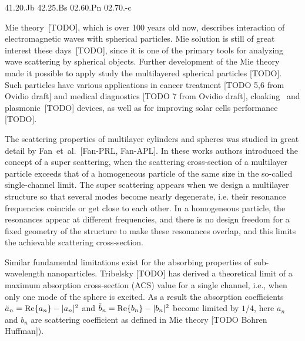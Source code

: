 \documentclass[aps,prl,twocolumn,showpacs,superscriptaddress,groupedaddress]{revtex4-1}
\begin{document}
\pacs%
{41.20.Jb 42.25.Bs 02.60.Pn 02.70.-c}

\maketitle %

Mie theory~[TODO], which is over 100 years old now, describes
interaction of electromagnetic waves with spherical particles. Mie
solution is still of great interest these days~[TODO], since it is one
of the primary tools for analyzing wave scattering by spherical
objects. Further development of the Mie theory~\cite{Yang-2003,
  Pena-scattnlay-2009} made it possible to apply study the
multilayered spherical particles [TODO]. Such particles have various
applications in cancer treatment [TODO 5,6 from Ovidio draft] and
medical diagnostics [TODO 7 from Ovidio draft],
cloaking~\cite{Semouchkina-2013, Ladutenko-2014} and plasmonic~[TODO]
devices, as well as for improving solar cells performance [TODO].

The scattering properties of multilayer cylinders and spheres was
studied in great detail by Fan~et~al.~[Fan-PRL, Fan-APL]. In these
works authors introduced the concept of a super scattering, when the
scattering cross-section of a multilayer particle exceeds that of a
homogeneous particle of the same size in the so-called single-channel
limit. The super scattering appears when we design a multilayer
structure so that several modes become nearly degenerate, i.e. their
resonance frequencies coincide or get close to each other. In a
homogeneous particle, the resonances appear at different frequencies,
and there is no design freedom for a fixed geometry of the structure
to make these resonances overlap, and this limits the achievable
scattering cross-section.

Similar fundamental limitations exist for the absorbing properties of
sub-wavelength nanoparticles.  Tribelsky [TODO] has derived a
theoretical limit of a maximum absorption cross-section (ACS) value
for a single channel, i.e., when only one mode of the sphere is
excited.  As a result the absorption coefficients $\tilde{a}_n= {\rm
  Re}\{a_n\} - |a_n|^2 $ and $\tilde{b}_n= {\rm Re}\{b_n\} - |b_n|^2 $
become limited by $1/4$, here $a_n$ and $b_n$ are scattering
coefficient as defined in Mie theory [TODO Bohren Huffman]).
\end{document}
